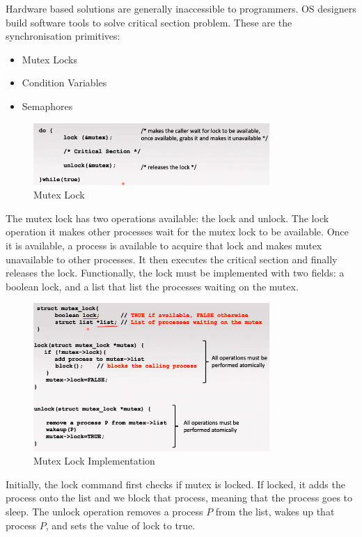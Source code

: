 \documentclass[a4paper]{article}
\theoremstyle{plain}
\theoremstyle{definition}
\newtheorem{defn}{Definition}[section]
\theoremstyle{remark}
\begin{document}
\begin{tcolorbox}[colback=black!3!white,colframe=black!60!white,title=\begin{defn}Synchronisation Primitives \label{Synchronisation Primitives}\end{defn}]
Hardware based solutions are generally inaccessible to programmers. OS designers build software tools to solve critical section problem. These are the synchronisation primitives:
\begin{itemize}
	\item Mutex Locks
	\item Condition Variables
	\item Semaphores
\end{itemize}
\end{tcolorbox}
\begin{tcolorbox}[colback=black!3!white,colframe=black!60!white,title=\begin{defn}Mutex Lock \label{Mutex Lock}\end{defn}]
\begin{figure}[H]
	\centering
	\includegraphics[width=0.8\textwidth]{fourtyfive.png}
	\caption{Mutex Lock}
	\label{fig:fourtyfive-png}
\end{figure}
The mutex lock has two operations available: the lock and unlock. The lock operation it makes other processes wait for the mutex lock to be available. Once it is available, a process is available to acquire that lock and makes mutex unavailable to other processes. It then executes the critical section and finally releases the lock. Functionally, the lock must be implemented with two fields: a boolean lock, and a list that list the processes waiting on the mutex. 
\begin{figure}[H]
	\centering
	\includegraphics[width=0.8\textwidth]{fourtysix.png}
	\caption{Mutex Lock Implementation}
	\label{fig:fourtysix-png}
\end{figure}
Initially, the lock command first checks if mutex is locked. If locked, it adds the process onto the list and we block that process, meaning that the process goes to sleep. The unlock operation removes a process $P$ from the list, wakes up that process $P$, and sets the value of lock to true. 
\end{tcolorbox}
\end{document}
